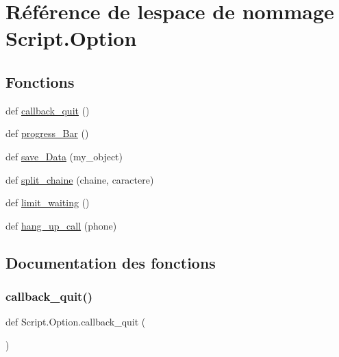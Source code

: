 \hypertarget{namespaceScript_1_1Option}{}\section{Référence de l\textquotesingle{}espace de nommage Script.\+Option}
\label{namespaceScript_1_1Option}
\subsection*{Fonctions}
\begin{DoxyCompactItemize}
\item 
def \hyperlink{namespaceScript_1_1Option_abb674ebac6565861fc8240a9306f8ecd}{callback\+\_\+quit} ()
\item 
def \hyperlink{namespaceScript_1_1Option_aff91639f98fde0463987ea08e565da05}{progress\+\_\+\+Bar} ()
\item 
def \hyperlink{namespaceScript_1_1Option_a09506d9cf0343fc80883c5db0a207737}{save\+\_\+\+Data} (my\+\_\+object)
\item 
def \hyperlink{namespaceScript_1_1Option_ac71533bc42f23543f3c564ccf01d9faf}{split\+\_\+chaine} (chaine, caractere)
\item 
def \hyperlink{namespaceScript_1_1Option_a1707d1e8b288159100845df330fc8d51}{limit\+\_\+waiting} ()
\item 
def \hyperlink{namespaceScript_1_1Option_a22c03fd81ddb28ef13f194565b4996ba}{hang\+\_\+up\+\_\+call} (phone)
\end{DoxyCompactItemize}


\subsection{Documentation des fonctions}
\mbox{\label{namespaceScript_1_1Option_abb674ebac6565861fc8240a9306f8ecd}} 
\subsubsection{\texorpdfstring{callback\+\_\+quit()}{callback\_quit()}}
{\footnotesize\ttfamily def Script.\+Option.\+callback\+\_\+quit (\begin{DoxyParamCaption}{ }\end{DoxyParamCaption})}



